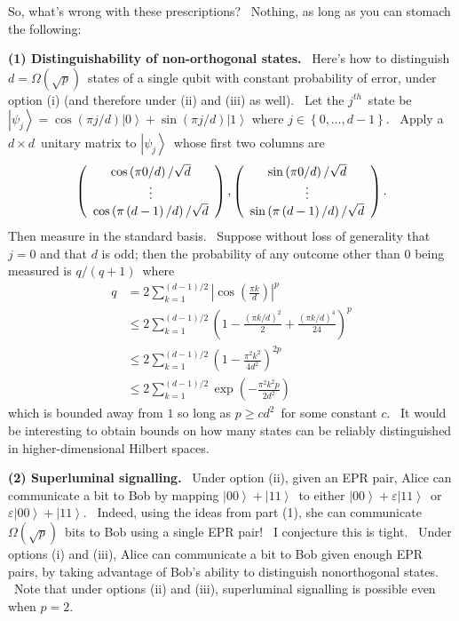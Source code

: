 \documentclass[12pt]{article}%
\begin{document}
So, what's wrong with these prescriptions? \ Nothing, as long as you can
stomach the following:

\textbf{(1) Distinguishability of non-orthogonal states.} \ Here's how to
distinguish $d=\Omega\left(  \sqrt{p}\right)  $\ states of a single qubit with
constant probability of error, under option (i) (and therefore under (ii) and
(iii) as well). \ Let the $j^{th}$\ state be $\left\vert \psi_{j}\right\rangle
=\cos\left(  \pi j/d\right)  \left\vert 0\right\rangle +\sin\left(  \pi
j/d\right)  \left\vert 1\right\rangle $ where $j\in\left\{  0,\ldots
,d-1\right\}  $. \ Apply a $d\times d$\ unitary matrix to $\left\vert \psi
_{j}\right\rangle $\ whose first two columns are%
\[
\left(
\begin{array}
[c]{c}%
\cos\left(  \pi0/d\right)  /\sqrt{d}\\
\vdots\\
\cos\left(  \pi\left(  d-1\right)  /d\right)  /\sqrt{d}%
\end{array}
\right)  ,\left(
\begin{array}
[c]{c}%
\sin\left(  \pi0/d\right)  /\sqrt{d}\\
\vdots\\
\sin\left(  \pi\left(  d-1\right)  /d\right)  /\sqrt{d}%
\end{array}
\right)  .
\]
Then measure in the standard basis. \ Suppose without loss of generality that
$j=0$ and that $d$ is odd; then the probability of any outcome other than $0$
being measured is $q/\left(  q+1\right)  $\ where%
\begin{align*}
q  &  =2\sum_{k=1}^{\left(  d-1\right)  /2}\left\vert \cos\left(  \frac{\pi
k}{d}\right)  \right\vert ^{p}\\
&  \leq2\sum_{k=1}^{\left(  d-1\right)  /2}\left(  1-\frac{\left(  \pi
k/d\right)  ^{2}}{2}+\frac{\left(  \pi k/d\right)  ^{4}}{24}\right)  ^{p}\\
&  \leq2\sum_{k=1}^{\left(  d-1\right)  /2}\left(  1-\frac{\pi^{2}k^{2}%
}{4d^{2}}\right)  ^{2p}\\
&  \leq2\sum_{k=1}^{\left(  d-1\right)  /2}\exp\left(  -\frac{\pi^{2}k^{2}%
p}{2d^{2}}\right)
\end{align*}
which is bounded away from $1$ so long as $p\geq cd^{2}$\ for some constant
$c$. \ It would be interesting to obtain bounds on how many states can be
reliably distinguished in higher-dimensional Hilbert spaces.

\textbf{(2) Superluminal signalling.} \ Under option (ii), given an EPR pair,
Alice can communicate a bit to Bob by mapping $\left\vert 00\right\rangle
+\left\vert 11\right\rangle $\ to either $\left\vert 00\right\rangle
+\varepsilon\left\vert 11\right\rangle $\ or $\varepsilon\left\vert
00\right\rangle +\left\vert 11\right\rangle $. \ Indeed, using the ideas from
part (1), she can communicate $\Omega\left(  \sqrt{p}\right)  $\ bits to Bob
using a single EPR pair! \ I conjecture this is tight. \ Under options (i) and
(iii), Alice can communicate a bit to Bob given enough EPR pairs, by taking
advantage of Bob's ability to distinguish nonorthogonal states. \ Note that
under options (ii) and (iii), superluminal signalling is possible even when
$p=2$.
\end{document}
